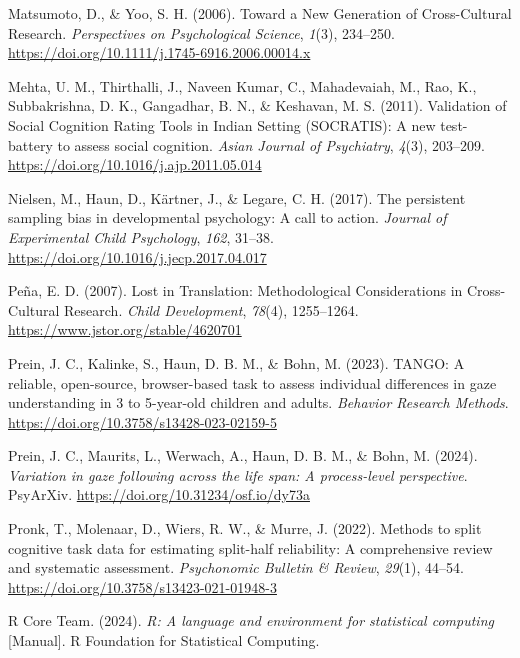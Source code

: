 \documentclass[
  man,floatsintext]{apa7}
\newlength{\cslhangindent}
\newenvironment{CSLReferences}[2] %
 {\begin{list}{}{%
  \setlength{\itemindent}{0pt}
  \setlength{\leftmargin}{0pt}
  \setlength{\parsep}{0pt}
  \ifodd #1
   \setlength{\leftmargin}{\cslhangindent}
   \setlength{\itemindent}{-1\cslhangindent}
  \fi
  \setlength{\itemsep}{#2\baselineskip}}}
 {\end{list}}
\begin{document}
\begin{CSLReferences}{1}{0}
Matsumoto, D., \& Yoo, S. H. (2006). Toward a {New Generation} of {Cross-Cultural Research}. \emph{Perspectives on Psychological Science}, \emph{1}(3), 234--250. \url{https://doi.org/10.1111/j.1745-6916.2006.00014.x}

Mehta, U. M., Thirthalli, J., Naveen Kumar, C., Mahadevaiah, M., Rao, K., Subbakrishna, D. K., Gangadhar, B. N., \& Keshavan, M. S. (2011). Validation of {Social Cognition Rating Tools} in {Indian Setting} ({SOCRATIS}): {A} new test-battery to assess social cognition. \emph{Asian Journal of Psychiatry}, \emph{4}(3), 203--209. \url{https://doi.org/10.1016/j.ajp.2011.05.014}

Nielsen, M., Haun, D., Kärtner, J., \& Legare, C. H. (2017). The persistent sampling bias in developmental psychology: {A} call to action. \emph{Journal of Experimental Child Psychology}, \emph{162}, 31--38. \url{https://doi.org/10.1016/j.jecp.2017.04.017}

Peña, E. D. (2007). Lost in {Translation}: {Methodological Considerations} in {Cross-Cultural Research}. \emph{Child Development}, \emph{78}(4), 1255--1264. \url{https://www.jstor.org/stable/4620701}

Prein, J. C., Kalinke, S., Haun, D. B. M., \& Bohn, M. (2023). {TANGO}: {A} reliable, open-source, browser-based task to assess individual differences in gaze understanding in 3 to 5-year-old children and adults. \emph{Behavior Research Methods}. \url{https://doi.org/10.3758/s13428-023-02159-5}

Prein, J. C., Maurits, L., Werwach, A., Haun, D. B. M., \& Bohn, M. (2024). \emph{Variation in gaze following across the life span: {A} process-level perspective}. PsyArXiv. \url{https://doi.org/10.31234/osf.io/dy73a}

Pronk, T., Molenaar, D., Wiers, R. W., \& Murre, J. (2022). Methods to split cognitive task data for estimating split-half reliability: {A} comprehensive review and systematic assessment. \emph{Psychonomic Bulletin \& Review}, \emph{29}(1), 44--54. \url{https://doi.org/10.3758/s13423-021-01948-3}

R Core Team. (2024). \emph{R: {A} language and environment for statistical computing} {[}Manual{]}. R Foundation for Statistical Computing.


\end{CSLReferences}
\end{document}
